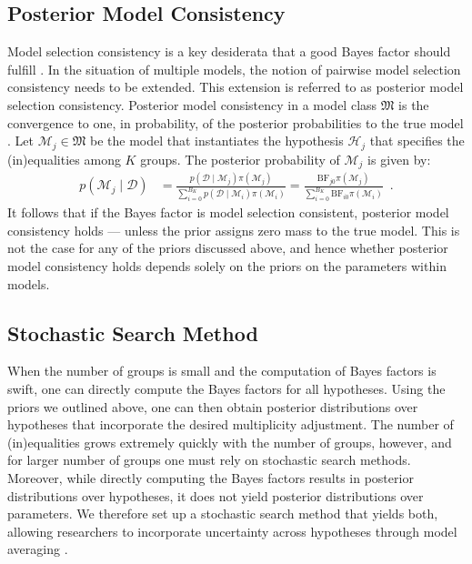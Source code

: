 \documentclass[11pt,a4paper]{article}
\theoremstyle{definition} %
\theoremstyle{case}
\newcommand{\bellnum}[1]{B_{#1}}
\begin{document}
\subsection{Posterior Model Consistency}
Model selection consistency is a key desiderata that a good Bayes factor should fulfill \parencite[e.g.,][]{bayarri2012criteria, ly2016harold, consonni2018prior}. In the situation of multiple models, the notion of pairwise model selection consistency needs to be extended. This extension is referred to as posterior model selection consistency. Posterior model consistency in a model class $\mathfrak{M}$ is the convergence to one, in probability, of the posterior probabilities to the true model \parencite[e.g.,][]{casella2009consistency, moreno2015posterior}. Let $\mathcal{M}_j \in \mathfrak{M}$ be the model that instantiates the hypothesis $\mathcal{H}_j$ that specifies the (in)equalities among $K$ groups. The posterior probability of $\mathcal{M}_j$ is given by:
\begin{align}
    p(\mathcal{M}_j \mid \mathcal{D}) &= \frac{p(\mathcal{D} \mid \mathcal{M}_j) \pi(\mathcal{M}_j)}{\sum_{i = 0}^{\bellnum{K}} p(\mathcal{D} \mid \mathcal{M}_i) \pi(\mathcal{M}_i)}
    = \frac{\text{BF}_{j0}\pi(\mathcal{M}_j)}{\sum_{i = 0}^{\bellnum{K}} \text{BF}_{i0} \pi(\mathcal{M}_i)} \enspace .
\end{align}
It follows that if the Bayes factor is model selection consistent, posterior model consistency holds \parencite[see also][Theorem 1]{moreno2015posterior} --- unless the prior assigns zero mass to the true model. This is not the case for any of the priors discussed above, and hence whether posterior model consistency holds depends solely on the priors on the parameters within models.

\subsection{Stochastic Search Method} \label{sec:method-description}
When the number of groups is small and the computation of Bayes factors is swift, one can directly compute the Bayes factors for all hypotheses. Using the priors we outlined above, one can then obtain posterior distributions over hypotheses that incorporate the desired multiplicity adjustment. The number of (in)equalities grows extremely quickly with the number of groups, however, and for larger number of groups one must rely on stochastic search methods. Moreover, while directly computing the Bayes factors results in posterior distributions over hypotheses, it does not yield posterior distributions over parameters. We therefore set up a stochastic search method that yields both, allowing researchers to incorporate uncertainty across hypotheses through model averaging \parencite[e.g.,][]{hinne2020conceptual, hoeting1999bayesian}.
\end{document}
